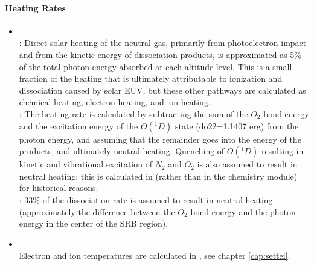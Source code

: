 \paragraph{Heating Rates}
%
\begin{itemize}
	\item {} \\
	:  Direct solar heating of the neutral gas, primarily from photoelectron 
	impact and from the kinetic energy of dissociation products, is approximated 
	as 5\% of the total photon energy absorbed at each altitude level.  This is a 
	small fraction of the heating that is ultimately attributable to ionization 
	and dissociation caused by solar EUV, but these other pathways are calculated 
	as chemical heating, electron heating, and ion heating.\\
	:  The heating rate is calculated by subtracting the sum of the $O_2$ 
	bond energy and the excitation energy of the $O(^1D)$ state (do22=1.1407 erg) 
	from the photon energy, and assuming that the remainder goes into the 
	energy of the products, and ultimately neutral heating.  Quenching of 
	$O(^1D)$ resulting in kinetic and vibrational excitation of $N_2$ and $O_2$ is 
	also assumed to result in neutral heating; this is calculated in  
	(rather than in the chemistry module) for historical reasons. \\
	:  33\% of the dissociation rate is assumed to result in neutral 
	heating (approximately the difference between the $O_2$ bond energy and 
	the photon energy in the center of the SRB region).

        \item {}\\
	Electron and ion temperatures are calculated in , 
	see chapter \ref{cap:settei}.

\end{itemize}
